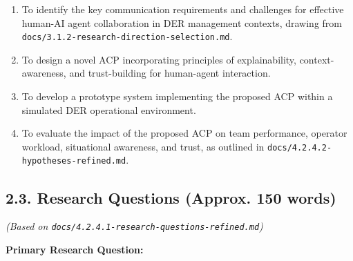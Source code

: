 \documentclass[12pt,a4paper]{article}
\begin{document}
\begin{enumerate}
\item  To identify the key communication requirements and challenges for effective human-AI agent collaboration in DER management contexts, drawing from \texttt{docs/3.1.2-research-direction-selection.md}.
\item  To design a novel ACP incorporating principles of explainability, context-awareness, and trust-building for human-agent interaction.
\item  To develop a prototype system implementing the proposed ACP within a simulated DER operational environment.
\item  To evaluate the impact of the proposed ACP on team performance, operator workload, situational awareness, and trust, as outlined in \texttt{docs/4.2.4.2-hypotheses-refined.md}.
\end{enumerate}

\subsection{2.3. Research Questions (Approx. 150 words)}
\emph{(Based on \texttt{docs/4.2.4.1-research-questions-refined.md})}

\textbf{Primary Research Question:}
\end{document}
